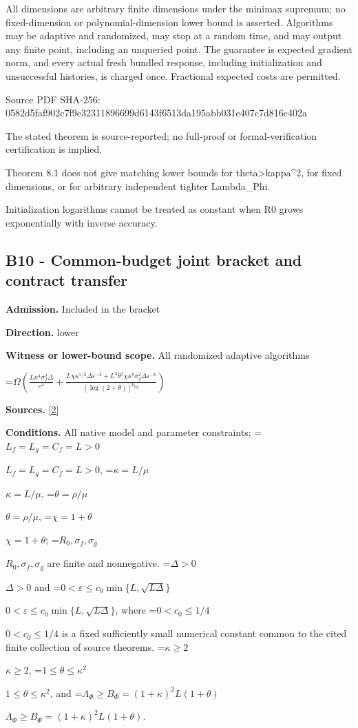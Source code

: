 \documentclass[10pt,a4paper]{article}
\newcommand{\AtlasMath}[1]{\par\begingroup\centering\setbox0=\hbox{$\displaystyle #1$}\ifdim\wd0>1.4\linewidth\typeout{ATLAS WIDE FORMULA: \the\wd0}\fi\ifdim\wd0>\linewidth\resizebox{\linewidth}{!}{\box0}\else\box0\fi\par\endgroup}
\newcommand{\AtlasInlineMath}[1]{\begingroup\setbox0=\hbox{$#1$}\ifdim\wd0>.4\linewidth\endgroup\AtlasMath{#1}\else\endgroup$#1$\fi}
\begin{document}
All dimensions are arbitrary finite dimensions under the minimax supremum; no fixed-dimension or polynomial-dimension lower bound is asserted. Algorithms may be adaptive and randomized, may stop at a random time, and may output any finite point, including an unqueried point. The guarantee is expected gradient norm, and every actual fresh bundled response, including initialization and unsuccessful histories, is charged once. Fractional expected costs are permitted.



Source PDF SHA-256: 0582d5faf902c7f9e3231189\allowbreak{}6699d6143f6513da195abb03\allowbreak{}1e407c7d816c402a



The stated theorem is source-reported; no full-proof or formal-verification certification is implied.



Theorem 8.1 does not give matching lower bounds for theta>kappa\textasciicircum{}2, for fixed dimensions, or for arbitrary independent tighter Lambda\_Phi.



Initialization logarithms cannot be treated as constant when R0 grows exponentially with inverse accuracy.



\subsection{B10 - Common-budget joint bracket and contract transfer}


\textbf{Admission.} Included in the bracket



\textbf{Direction.} lower



\textbf{Witness or lower-bound scope.} All randomized adaptive algorithms



\AtlasMath{\Omega\!\left(\frac{L\kappa^4\sigma_f^2\Delta}{\varepsilon^4}+\frac{L\chi\kappa^{5/2}\Delta\varepsilon^{-2}+L^3\theta^2\chi\kappa^8\sigma_g^2\Delta\varepsilon^{-6}}{[\log(2+\theta)]^{p_{\log}}}\right)}


\textbf{Sources.} \href{https://github.com/WU-Wendao/Colombo/blob/main/colombo_sensorium/Complexity_altas/data/sources/colombo/SFO_JOINT_20261126/manuscript.pdf}{[2]}



\textbf{Conditions.} All native model and parameter constraints; \AtlasInlineMath{L_f=L_g=C_f=L>0}, \AtlasInlineMath{\kappa=L/\mu}, \AtlasInlineMath{\theta=\rho/\mu}, \AtlasInlineMath{\chi=1+\theta}; \AtlasInlineMath{R_0,\sigma_f,\sigma_g} are finite and nonnegative. \AtlasInlineMath{\Delta>0} and \AtlasInlineMath{0<\varepsilon\le c_0\min\{L,\sqrt{L\Delta}\}}, where \AtlasInlineMath{0<c_0\le1/4} is a fixed sufficiently small numerical constant common to the cited finite collection of source theorems. \AtlasInlineMath{\kappa\ge2}, \AtlasInlineMath{1\le\theta\le\kappa^2}, and \AtlasInlineMath{\Lambda_\Phi\ge B_\Phi=(1+\kappa)^2L(1+\theta)}.
\end{document}

